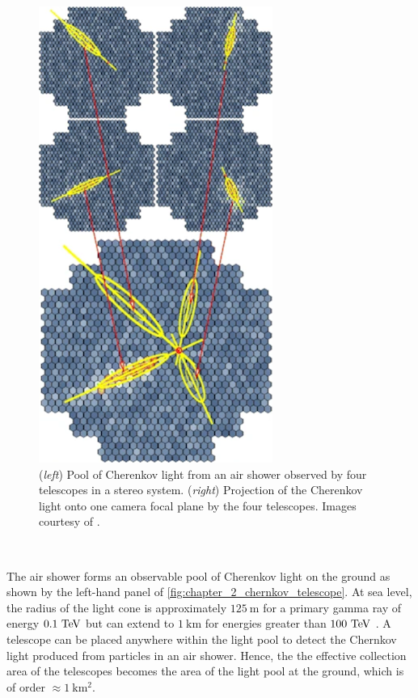 \begin{figure}[h]
    \includegraphics[height=0.4\textheight]{05_Astronomy/Images/air_shower/cherenkov_telescope.png}
    \caption{(\textit{left}) Pool of Cherenkov light from an air shower observed by four telescopes in a stereo system.
    (\textit{right}) Projection of the Cherenkov light onto one camera focal plane by the four telescopes. Images courtesy of \cite{2009ExA....25..173V,}.}
    \label{fig:chapter_2_chernkov_telescope}
\end{figure}
\par~\par
The air shower forms an observable pool of Cherenkov light on the ground as shown by the left-hand panel of \autoref{fig:chapter_2_chernkov_telescope}. At sea level, the radius of the light cone is approximately $125~\si{\meter}$ for a primary gamma ray of energy $0.1~\TeV$ but can extend to $1~\si{\kilo\meter}$ for energies greater than $100~\TeV$ \citep{Patterson_1983}.  A telescope can be placed anywhere within the light pool to detect the Chernkov light produced from particles in an air shower. Hence, the the effective collection area of the telescopes becomes the area of the light pool at the ground, which is of order $\approx1~\si{\kilo\meter\squared}$.
\par~\par
